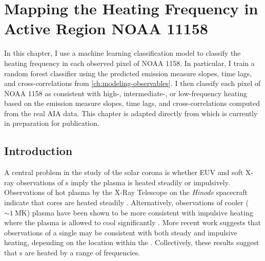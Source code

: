 \chapter{Mapping the Heating Frequency in Active Region NOAA 11158}\label{ch:classifying-observables}
\thispagestyle{firstpageofchapterstyle}

In this chapter, I use a machine learning classification model to classify the heating frequency in each observed pixel of \AR{} NOAA 1158. In particular, I train a random forest classifier using the predicted emission measure slopes, time lags, and cross-correlations from \autoref{ch:modeling-observables}. I then classify each pixel of NOAA 1158 as consistent with high-, intermediate-, or low-frequency heating based on the emission measure slopes, time lags, and cross-correlations computed from the real AIA data. This chapter is adapted directly from \citet{barnes_understanding_2019-1} which is currently in preparation for publication.

\section{Introduction}\label{sec:classifying-observables:introduction}

A central problem in the study of the solar corona is whether EUV and soft X-ray observations of \AR s imply the plasma is heated steadily or impulsively. Observations of hot plasma by the X-Ray Telescope \citep[XRT,][]{golub_x-ray_2007} on the \textit{Hinode} spacecraft \citep{kosugi_hinode_2007} indicate that \AR{} cores are heated steadily \citep[e.g.][]{warren_constraints_2011,winebarger_using_2011}. Alternatively, observations of cooler ($\sim\SI{1}{\mega\kelvin}$) plasma have been shown to be more consistent with impulsive heating where the plasma is allowed to cool significantly \citep[e.g]{winebarger_evolving_2003,mulu-moore_determining_2011,ugarte-urra_investigation_2006,viall_patterns_2011,viall_evidence_2012}. More recent work \citep{del_zanna_evolution_2015,bradshaw_patterns_2016} suggests that observations of a single \AR{} may be consistent with both steady and impulsive heating, depending on the location within the \AR{}. Collectively, these results suggest that \AR s are heated by a range of frequencies.

